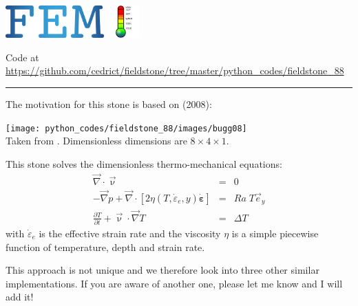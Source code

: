 \includegraphics[height=1.25cm]{images/pictograms/FEM}
\includegraphics[height=1.25cm]{images/pictograms/temperature}


%

\begin{center}
Code at \url{https://github.com/cedrict/fieldstone/tree/master/python_codes/fieldstone_88}
\end{center}

\par\noindent\rule{\textwidth}{0.4pt}



The motivation for this stone is based on \textcite{bugg08} (2008):

\begin{center}
\texttt{[image: python\_codes/fieldstone\_88/images/bugg08]}\\
{\captionfont Taken from \cite{bugg08}. Dimensionless dimensions are $8\times 4 \times 1$.}
\end{center}

This stone solves the dimensionless thermo-mechanical equations:
\begin{eqnarray}
\vec\nabla\cdot\vec\upnu &=& 0 \\
-\vec\nabla p + \vec\nabla \cdot [ 2 \eta(T,\dot{\varepsilon}_e,y) \dot{\bm \varepsilon} ] &=& Ra\; T \vec{e}_y \\
\frac{\partial T}{\partial t} + \vec\upnu \cdot \vec\nabla T &=& \Delta T
\end{eqnarray}
with $\dot{\varepsilon}_e$ is the effective strain rate and the viscosity $\eta$ is a simple
piecewise function of temperature, depth and strain rate.

This approach is not unique and we therefore look into three other similar implementations.
If you are aware of another one, please let me know and I will add it!

